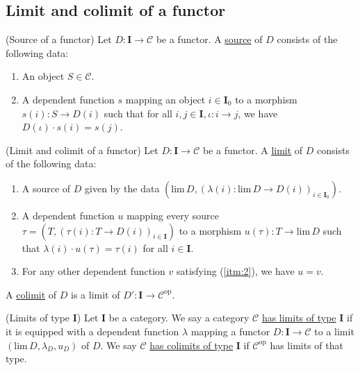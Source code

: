
\subsection{Limit and colimit of a functor}

\begin{definition}{(Source of a functor)}
Let $D : \mathbf{I} \rightarrow \mathcal{C}$ be a functor. A \ul{source} of $D$ consists of the following data:
\begin{enumerate}
\renewcommand{\labelenumi}{(\theenumi)}
\item An object $S \in \mathcal{C}$.
\item A dependent function $s$ mapping an object $i \in \mathbf{I}_{0}$ to a morphism
$s(i) : S \rightarrow D(i)$ such that for all $i, j \in \mathbf{I}, \iota : i \rightarrow j$, we have $D(\iota) \cdot s(i) = s(j)$.
\end{enumerate}
\end{definition}

\begin{definition}{(Limit and colimit of a functor)}
Let $D : \mathbf{I} \rightarrow \mathcal{C}$ be a functor. A \ul{limit} of $D$ consists of the
following data:
\begin{enumerate}
\renewcommand{\labelenumi}{(\theenumi)}
\item A source of $D$ given by the data $(\mathrm{lim}\, D, (\lambda(i) : \mathrm{lim}\, D \rightarrow D(i))_{i\in\mathbf{I}_{0}})$.
\item A dependent function $u$ mapping every source $\tau = (T, (\tau(i) : T \rightarrow D(i))_{i \in \mathbf{I}})$ to a
morphism $u(\tau) : T \rightarrow \mathrm{lim}\, D$ such that $\lambda(i) \cdot u(\tau) = \tau(i)$ for all $i \in \mathbf{I}$.\label{itm:2}
\item For any other dependent function $v$ satisfying (\ref{itm:2}), we have $u = v$.
\end{enumerate}
A \ul{colimit} of $D$ is a limit of $D' : \mathbf{I} \rightarrow \mathcal{C}^{\mathrm{op}}$.
\end{definition}

\begin{definition}{(Limits of type \textbf{I})}
Let $\mathbf{I}$ be a category. We say a category $\mathcal{C}$ \ul{has limits of type} $\mathbf{I}$ if it is
equipped with a dependent function $\lambda$ mapping a functor $D : \mathbf{I} \rightarrow \mathcal{C}$ to a limit
$(\mathrm{lim}\, D, \lambda_{D}, u_{D})$ of $D$.
We say $\mathcal{C}$ \ul{has colimits of type} $\mathbf{I}$ if $\mathcal{C}^{\mathrm{op}}$ has limits of that type.
\end{definition}


